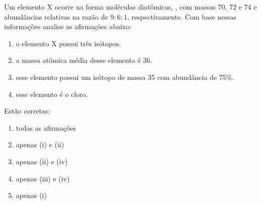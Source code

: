 Um elemento X ocorre na forma moléculas diatômicas,  , com massas 70, 72 e 74 e abundâncias relativas na razão de $9 : 6 : 1$, respectivamente.
Com base nessas informações analise as afirmações abaixo:

\begin{enumerate}[label = (\roman*)]
\item o elemento X possui três isótopos.
\item a massa atômica média desse elemento é 36.
\item esse elemento possui um isótopo de massa 35 com abundância de 75\%.
\item esse elemento é o cloro.
\end{enumerate}

Estão corretas:

\begin{enumerate}[label = (\alph*)]
	\item todas as afirmações
	\item apenas (i) e (ii)
	\item apenas (ii) e (iv)
	\item apenas (iii) e (iv)
	\item apenas (i)
\end{enumerate}
